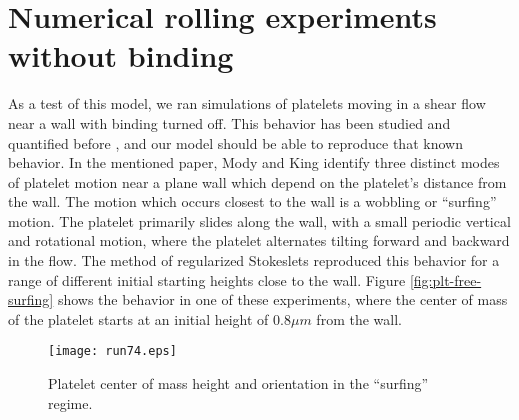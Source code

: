 

\section{Numerical rolling experiments without binding}
\label{sec:numer-roll-exper}

As a test of this model, we ran simulations of platelets moving in a
shear flow near a wall with binding turned off. This behavior has been
studied and quantified before \cite{Mody2005}, and our model should be
able to reproduce that known behavior. In the mentioned paper, Mody
and King identify three distinct modes of platelet motion near a plane
wall which depend on the platelet's distance from the wall. The motion
which occurs closest to the wall is a wobbling or ``surfing''
motion. The platelet primarily slides along the wall, with a small
periodic vertical and rotational motion, where the platelet alternates
tilting forward and backward in the flow. The method of regularized
Stokeslets reproduced this behavior for a range of different initial
starting heights close to the wall. Figure \ref{fig:plt-free-surfing}
shows the behavior in one of these experiments, where the center of
mass of the platelet starts at an initial height of $0.8 \mu m$ from
the wall.

\begin{figure}
  \centering
  \texttt{[image: run74.eps]}
  \caption[Platelet surfing motion]{Platelet center of mass
    height and orientation in the ``surfing'' regime.}
  \label{fig:plt-surfing}
\end{figure}


